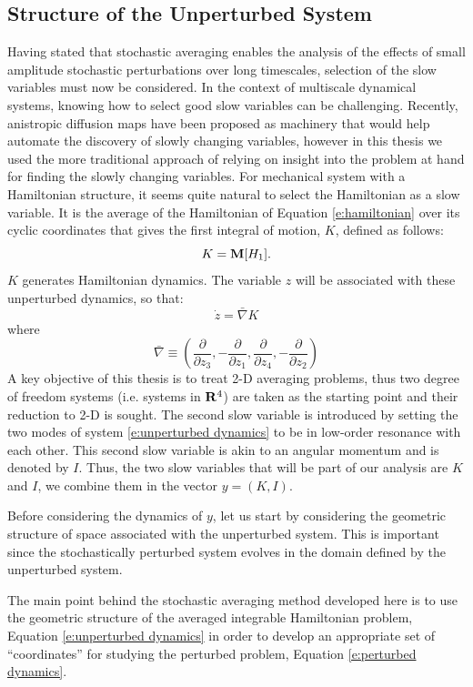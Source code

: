 \subsection{Structure of the Unperturbed System}

Having stated that stochastic averaging enables the analysis of the effects of small amplitude stochastic perturbations over long timescales, selection of the slow variables must now be considered. In the context of multiscale dynamical systems, knowing how to select good slow variables can be challenging. Recently, anistropic diffusion maps \citep{singer09:_detec} have been proposed as machinery that would help automate the discovery of slowly changing variables, however in this thesis we used the more traditional approach of relying on insight into the problem at hand for finding the slowly changing variables. For mechanical system with a Hamiltonian structure, it seems quite natural to select the Hamiltonian as a slow variable. It is the average of the Hamiltonian of Equation \eqref{e:hamiltonian} over its cyclic coordinates that gives the first integral of motion, $K$, defined as follows:
\[
K = \operatorname{\mathbf M}[H_1].
\]
$K$ generates Hamiltonian dynamics. The variable $z$ will be associated with these unperturbed dynamics, so that:
\begin{equation}
\label{e:unperturbed dynamics}
\dot z = \bar \nabla K
\end{equation}
where
\[
\bar \nabla \equiv \left(\frac{\partial}{\partial z_3}, -\frac{\partial}{\partial z_1}, \frac{\partial}{\partial z_4}, -\frac{\partial}{\partial z_2}\right)
\]
A key objective of this thesis is to treat 2-D averaging problems, thus two degree of freedom systems (i.e. systems in $\mathbf R^4$) are taken as the starting point and their reduction to 2-D is sought. The second slow variable is introduced by setting the two modes of system \eqref{e:unperturbed dynamics} to be in low-order resonance with each other. This second slow variable is akin to an angular momentum and is denoted by $I$. Thus, the two slow variables that will be part of our analysis are $K$ and $I$, we combine them in the vector $y = (K,I)$.

Before considering the dynamics of $y$, let us start by considering the geometric structure of space associated with the unperturbed system. This is important since the stochastically perturbed system evolves in the domain defined by the unperturbed system.

The main point behind the stochastic averaging method developed here is to use the geometric structure of the averaged integrable Hamiltonian problem, Equation \eqref{e:unperturbed dynamics} in order to develop an appropriate set of ``coordinates'' for studying the perturbed problem, Equation \eqref{e:perturbed dynamics}.

